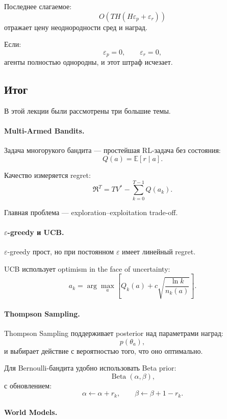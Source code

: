 \documentclass[12pt,a4paper]{article}
\begin{document}
Последнее слагаемое:
\[
O
\left(
TH(H\varepsilon_p+\varepsilon_r)
\right)
\]
отражает цену неоднородности сред и наград.

Если:
\[
\varepsilon_p=0,
\qquad
\varepsilon_r=0,
\]
агенты полностью однородны, и этот штраф исчезает.

\subsection{Итог}

В этой лекции были рассмотрены три большие темы.

\paragraph{Multi-Armed Bandits.}

Задача многорукого бандита --- простейшая RL-задача без состояния:
\[
Q(a)=\mathbb E[r\mid a].
\]

Качество измеряется regret:
\[
\mathfrak R^T
=
T V^\ast
-
\sum_{k=0}^{T-1}
Q(a_k).
\]

Главная проблема --- exploration--exploitation trade-off.

\paragraph{$\varepsilon$-greedy и UCB.}

$\varepsilon$-greedy прост, но при постоянном $\varepsilon$ имеет линейный regret.

UCB использует optimism in the face of uncertainty:
\[
a_k
=
\arg\max_a
\left[
Q_k(a)
+
c
\sqrt{
\frac{\ln k}{n_k(a)}
}
\right].
\]

\paragraph{Thompson Sampling.}

Thompson Sampling поддерживает posterior над параметрами наград:
\[
p(\theta_a),
\]
и выбирает действие с вероятностью того, что оно оптимально.

Для Bernoulli-бандита удобно использовать Beta prior:
\[
\operatorname{Beta}(\alpha,\beta),
\]
с обновлением:
\[
\alpha\leftarrow\alpha+r_k,
\qquad
\beta\leftarrow\beta+1-r_k.
\]

\paragraph{World Models.}
\end{document}
